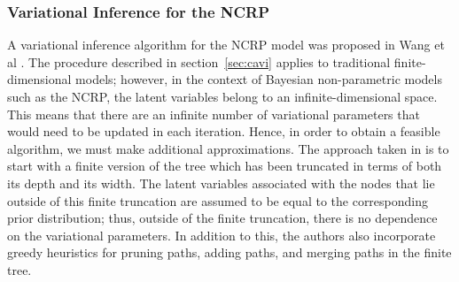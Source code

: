 \documentclass{article}
\begin{document}


\subsubsection{Variational Inference for the NCRP}

A variational inference algorithm for the NCRP model was proposed in Wang et al \cite{wang2009vi_ncrp}.
The procedure described in section~\ref{sec:cavi} applies to traditional finite-dimensional models;
however, in the context of Bayesian non-parametric models such as the NCRP, the latent variables belong to an infinite-dimensional space.
This means that there are an infinite number of variational parameters that would need to be updated in each iteration.
Hence, in order to obtain a feasible algorithm, we must make additional approximations.
The approach taken in \cite{wang2009vi_ncrp} is to start with a finite version of the tree which has been truncated in terms of both its depth and its width.
The latent variables associated with the nodes that lie outside of this finite truncation are assumed to be equal to the corresponding prior distribution; thus, outside of the finite truncation, there is no dependence on the variational parameters.
In addition to this, the authors also incorporate greedy heuristics for pruning paths, adding paths, and merging paths in the finite tree.

\end{document}
